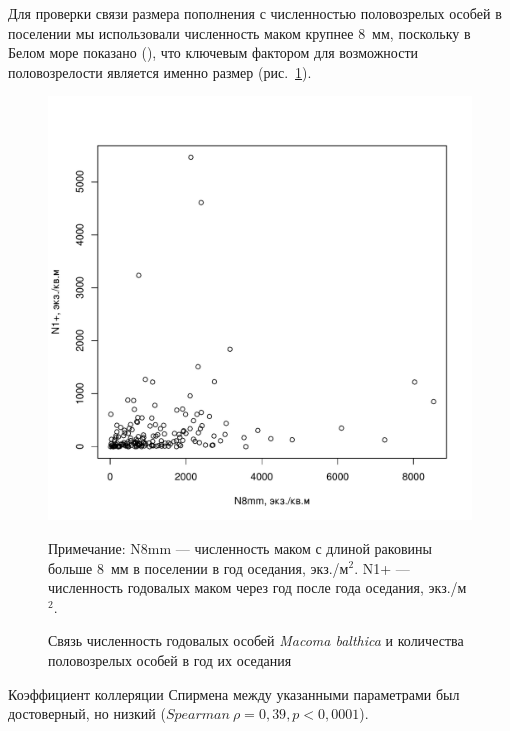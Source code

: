 Для проверки связи размера пополнения с численностью половозрелых особей в поселении мы использовали численность маком крупнее $8$~мм, поскольку в Белом море показано (\cite{Semenova_1980, Maximovich_1985}), что ключевым фактором для возможности половозрелости является именно размер (рис.~\ref{ris:N1year_vs_N8mm}).
    \begin{figure}[p]
        \includegraphics[width=\textwidth]{../White_Sea/oneyear_all_Kandalaksha_all/N8mm_vs_N1y_1.pdf}
    \caption{Связь численность годовалых особей {\it Macoma balthica} и количества половозрелых особей в год их оседания}
    \label{ris:N1year_vs_N8mm}

	\footnotesize{Примечание: N8mm --- численность маком с длиной раковины больше $8$~мм в поселении  в год оседания, экз./м$^2$. N1+ ---численность годовалых маком через год после года оседания, экз./м$^2$.}
    \end{figure}
Коэффициент коллеряции Спирмена между указанными параметрами был достоверный, но низкий ($Spearman\ \rho = 0,39, p < 0,0001$). 

